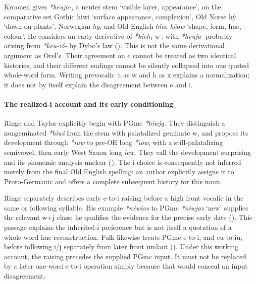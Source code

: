 \documentclass[
  british,
  a4paper,
]{article}
\providecommand{\Recon}[1]{\emph{*#1}}
\begin{document}
Kroonen gives \Recon{heuja-}, a neuter stem `visible layer, appearance',
on the comparative set Gothic {hiwi} `surface appearance, complexion',
Old Norse {hý} `down on plants', Norwegian \emph{hy}, and Old English
\emph{hīw}, \emph{hēow} `shape, form, hue, colour'. He considers an
early derivative of \emph{*kieh₁-u-}, with \emph{*heuja-} probably
arising from \emph{*kēu-ió-} by Dybo's law
(). This is not the same
derivational argument as Orel's. Their agreement on e cannot be treated
as two identical histories, and their different endings cannot be
silently collapsed into one quoted whole-word form. Writing prevocalic u
as w and h as x explains a normalization; it does not by itself explain
the disagreement between e and i.

\paragraph{The realized-i account and its early
conditioning}\label{the-realized-i-account-and-its-early-conditioning}

Ringe and Taylor explicitly begin with PGmc \emph{*hiwją}. They
distinguish a nongeminated \emph{*hiwi} from the stem with palatalized
geminate w, and propose its development through \emph{*iuw} to pre-OE
long \emph{*īow}, with a still-palatalizing semivowel, then early West
Saxon long \emph{īew}. They call the development surprising and its
phonemic analysis unclear (). The i choice is consequently not inferred merely
from the final Old English spelling: an author explicitly assigns it to
Proto-Germanic and offers a complete subsequent history for this noun.

Ringe separately describes early e-to-i raising before a high front
vocalic in the same or following syllable. His example \emph{*néwios} to
PGmc \emph{*niwjaz} `new' supplies the relevant w+j class; he qualifies
the evidence for the precise early date (). This passage explains the inherited-i preference but is
not itself a quotation of a whole-word hue reconstruction. Fulk likewise
treats PGmc e-to-i, and eu-to-iu, before following i/j separately from
later front umlaut (). Under this
working account, the raising precedes the supplied PGmc input. It must
not be replaced by a later one-word e-to-i operation simply because that
would conceal an input disagreement.
\end{document}
